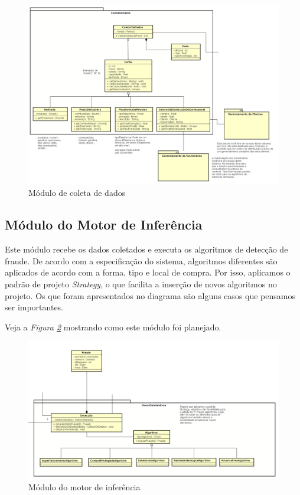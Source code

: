 \documentclass[a4paper,10pt]{article}
\begin{document}
\begin{figure}[ht]
  \centering
  \includegraphics[width=1\textwidth, keepaspectratio=true]{images/coleta.png}
  \caption {Módulo de coleta de dados}
  \label {coleta}
\end{figure}

\subsection{Módulo do Motor de Inferência}

Este módulo recebe os dados coletados e executa os algoritmos de detecção de fraude.
De acordo com a especificação do sistema, algoritmos diferentes são aplicados de
acordo com a forma, tipo e local de compra. Por isso, aplicamos o padrão de projeto
\emph{Strategy}, o que facilita a inserção de novos algoritmos no projeto. Os que
foram apresentados no diagrama são alguns casos que pensamos ser importantes. \par

Veja a \emph{Figura \ref{motor}} mostrando como este módulo foi planejado.

\begin{figure}[ht]
  \centering
  \includegraphics[width=1\textwidth, keepaspectratio=true]{images/motor.png}
  \caption {Módulo do motor de inferência}
  \label {motor}
\end{figure}
\end{document}
